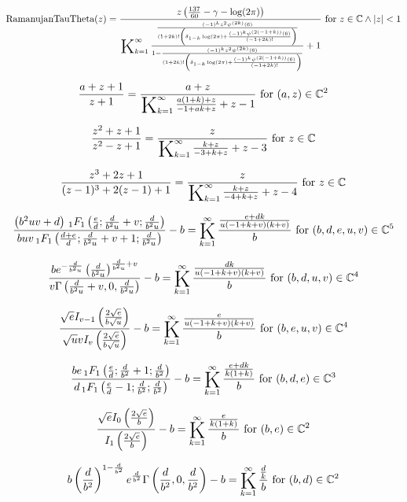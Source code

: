 \documentclass{article}
\newcommand{\bigK}{\mathop{\raisebox{-5pt}{\huge K}}}
\begin{document}
\[\text{RamanujanTauTheta}(z)=\frac{z \left(\frac{137}{60}-\gamma -\log (2 \pi )\right)}{\bigK_{k=1}^{\infty}\frac{\frac{(-1)^k z^2 \psi ^{(2 k)}(6)}{(1+2 k)! \left(\delta _{1-k} \log (2 \pi )+\frac{(-1)^k \psi ^{(2 (-1+k))}(6)}{(-1+2 k)!}\right)}}{1-\frac{(-1)^k z^2 \psi ^{(2 k)}(6)}{(1+2 k)! \left(\delta _{1-k} \log (2 \pi )+\frac{(-1)^k \psi ^{(2 (-1+k))}(6)}{(-1+2 k)!}\right)}}+1}\text{ for }z\in \mathbb{C}\land \left| z\right| <1\] 

\[\frac{a+z+1}{z+1}=\frac{a+z}{\bigK_{k=1}^{\infty}\frac{a (1+k)+z}{-1+a k+z}+z-1}\text{ for }(a,z)\in \mathbb{C}^2\] 

\[\frac{z^2+z+1}{z^2-z+1}=\frac{z}{\bigK_{k=1}^{\infty}\frac{k+z}{-3+k+z}+z-3}\text{ for }z\in \mathbb{C}\] 

\[\frac{z^3+2 z+1}{(z-1)^3+2 (z-1)+1}=\frac{z}{\bigK_{k=1}^{\infty}\frac{k+z}{-4+k+z}+z-4}\text{ for }z\in \mathbb{C}\] 

\[\frac{\left(b^2 u v+d\right) \, _1F_1\left(\frac{e}{d};\frac{d}{b^2 u}+v;\frac{d}{b^2 u}\right)}{b u v \, _1F_1\left(\frac{d+e}{d};\frac{d}{b^2 u}+v+1;\frac{d}{b^2 u}\right)}-b=\bigK_{k=1}^{\infty}\frac{\frac{e+d k}{u (-1+k+v) (k+v)}}{b}\text{ for }(b,d,e,u,v)\in \mathbb{C}^5\] 

\[\frac{b e^{-\frac{d}{b^2 u}} \left(\frac{d}{b^2 u}\right)^{\frac{d}{b^2 u}+v}}{v \Gamma \left(\frac{d}{b^2 u}+v,0,\frac{d}{b^2 u}\right)}-b=\bigK_{k=1}^{\infty}\frac{\frac{d k}{u (-1+k+v) (k+v)}}{b}\text{ for }(b,d,u,v)\in \mathbb{C}^4\] 

\[\frac{\sqrt{e} I_{v-1}\left(\frac{2 \sqrt{e}}{b \sqrt{u}}\right)}{\sqrt{u} v I_v\left(\frac{2 \sqrt{e}}{b \sqrt{u}}\right)}-b=\bigK_{k=1}^{\infty}\frac{\frac{e}{u (-1+k+v) (k+v)}}{b}\text{ for }(b,e,u,v)\in \mathbb{C}^4\] 

\[\frac{b e \, _1F_1\left(\frac{e}{d};\frac{d}{b^2}+1;\frac{d}{b^2}\right)}{d \, _1F_1\left(\frac{e}{d}-1;\frac{d}{b^2};\frac{d}{b^2}\right)}-b=\bigK_{k=1}^{\infty}\frac{\frac{e+d k}{k (1+k)}}{b}\text{ for }(b,d,e)\in \mathbb{C}^3\] 

\[\frac{\sqrt{e} I_0\left(\frac{2 \sqrt{e}}{b}\right)}{I_1\left(\frac{2 \sqrt{e}}{b}\right)}-b=\bigK_{k=1}^{\infty}\frac{\frac{e}{k (1+k)}}{b}\text{ for }(b,e)\in \mathbb{C}^2\] 

\[b \left(\frac{d}{b^2}\right)^{1-\frac{d}{b^2}} e^{\frac{d}{b^2}} \Gamma \left(\frac{d}{b^2},0,\frac{d}{b^2}\right)-b=\bigK_{k=1}^{\infty}\frac{\frac{d}{k}}{b}\text{ for }(b,d)\in \mathbb{C}^2\] 
\end{document}
